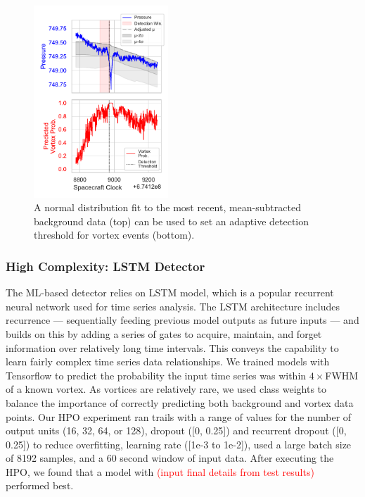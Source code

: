 \begin{figure}
    \centering
    \includegraphics[width=0.45\textwidth]{figures/manuscript_adaptive_detector_overview_fig_v1.pdf}
    \caption{A normal distribution fit to the most recent, mean-subtracted background data (top) can be used to set an adaptive detection threshold for vortex events (bottom).}
    \label{fig:detector2_overview}
\end{figure}

\subsubsection{High Complexity: \acrshort{LSTM} Detector}
The ML-based detector relies on \acrfull{LSTM} model, which is a popular recurrent neural network used for time series analysis. 
The \acrshort{LSTM} architecture includes recurrence — sequentially feeding previous model outputs as future inputs — and builds on this by adding a series of gates to acquire, maintain, and forget information over relatively long time intervals. 
This conveys the capability to learn fairly complex time series data relationships. 
We trained  models with Tensorflow to predict the probability the input time series was within $4\times$\acrshort{FWHM} of a known vortex. 
As vortices are relatively rare, we used class weights to balance the importance of correctly predicting both background and vortex data points. 
Our \acrshort{HPO} experiment ran trails with a range of values for the number of output units (16, 32, 64, or 128), dropout ([0, 0.25]) and recurrent dropout ([0, 0.25]) to reduce overfitting, learning rate ([1e-3 to 1e-2]), used a large batch size of 8192 samples, and a 60 second window of input data. 
After executing the \acrshort{HPO}, we found that a model with \textcolor{red}{(input final details from test results)} performed best.

